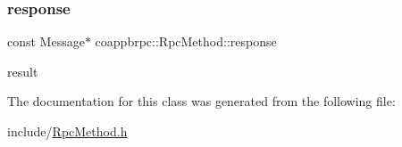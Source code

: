 \subsubsection{\texorpdfstring{response}{response}}
{\footnotesize\ttfamily const Message$\ast$ coappbrpc\+::\+Rpc\+Method\+::response}

result 

The documentation for this class was generated from the following file\+:\begin{DoxyCompactItemize}
\item 
include/\hyperlink{RpcMethod_8h}{Rpc\+Method.\+h}\end{DoxyCompactItemize}
